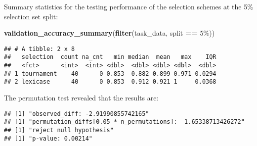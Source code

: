 \documentclass[
]{book}
\newenvironment{Shaded}{\begin{snugshade}}{\end{snugshade}}
\newcommand{\AttributeTok}[1]{\textcolor[rgb]{0.13,0.29,0.53}{#1}}
\newcommand{\DecValTok}[1]{\textcolor[rgb]{0.00,0.00,0.81}{#1}}
\newcommand{\FunctionTok}[1]{\textcolor[rgb]{0.13,0.29,0.53}{\textbf{#1}}}
\newcommand{\NormalTok}[1]{#1}
\newcommand{\OtherTok}[1]{\textcolor[rgb]{0.56,0.35,0.01}{#1}}
\newcommand{\SpecialCharTok}[1]{\textcolor[rgb]{0.81,0.36,0.00}{\textbf{#1}}}
\newcommand{\StringTok}[1]{\textcolor[rgb]{0.31,0.60,0.02}{#1}}
\begin{document}
Summary statistics for the testing performance of the selection schemes at the 5\% selection set split:

\begin{Shaded}
\begin{Highlighting}[]
\FunctionTok{validation\_accuracy\_summary}\NormalTok{(}\FunctionTok{filter}\NormalTok{(task\_data, split }\SpecialCharTok{==} \StringTok{\textquotesingle{}5\%\textquotesingle{}}\NormalTok{))}
\end{Highlighting}
\end{Shaded}

\begin{verbatim}
## # A tibble: 2 x 8
##   selection  count na_cnt   min median  mean   max    IQR
##   <fct>      <int>  <int> <dbl>  <dbl> <dbl> <dbl>  <dbl>
## 1 tournament    40      0 0.853  0.882 0.899 0.971 0.0294
## 2 lexicase      40      0 0.853  0.912 0.921 1     0.0368
\end{verbatim}

The permutation test revealed that the results are:

\begin{Shaded}
\end{Shaded}

\begin{verbatim}
## [1] "observed_diff: -2.91990855742165"
## [1] "permutation_diffs[0.05 * n_permutations]: -1.65338713426272"
## [1] "reject null hypothesis"
## [1] "p-value: 0.00214"
\end{verbatim}
\end{document}
